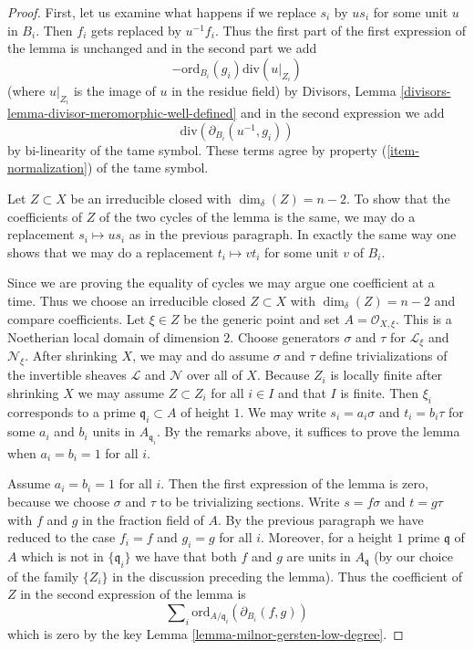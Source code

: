\begin{proof}
First, let us examine what happens if we replace $s_i$ by $us_i$
for some unit $u$ in $B_i$. Then $f_i$ gets replaced by $u^{-1} f_i$.
Thus the first part of the first expression of the lemma is unchanged
and in the second part we add
$$
-\text{ord}_{B_i}(g_i)\text{div}(u|_{Z_i})
$$
(where $u|_{Z_i}$ is the image of $u$ in the residue field) by
Divisors, Lemma \ref{divisors-lemma-divisor-meromorphic-well-defined}
and in the second expression we add
$$
\text{div}(\partial_{B_i}(u^{-1}, g_i))
$$
by bi-linearity of the tame symbol. These terms agree by property
(\ref{item-normalization}) of the tame symbol.

\medskip\noindent
Let $Z \subset X$ be an irreducible closed with $\dim_\delta(Z) = n - 2$.
To show that the coefficients of $Z$ of the two cycles of the lemma
is the same, we may do a replacement $s_i \mapsto us_i$ as in the previous
paragraph. In exactly the same way one shows that we may do a replacement
$t_i \mapsto vt_i$ for some unit $v$ of $B_i$.

\medskip\noindent
Since we are proving the equality of cycles we may argue one coefficient
at a time. Thus we choose an irreducible closed $Z \subset X$
with $\dim_\delta(Z) = n - 2$ and compare coefficients. Let $\xi \in Z$
be the generic point and set $A = \mathcal{O}_{X, \xi}$. This is a Noetherian
local domain of dimension $2$. Choose generators $\sigma$ and $\tau$
for $\mathcal{L}_\xi$ and $\mathcal{N}_\xi$. After shrinking $X$, we may
and do assume $\sigma$ and $\tau$ define trivializations
of the invertible sheaves $\mathcal{L}$ and $\mathcal{N}$ over all of $X$.
Because $Z_i$ is locally
finite after shrinking $X$ we may assume $Z \subset Z_i$ for all $i \in I$
and that $I$ is finite. Then $\xi_i$ corresponds to a prime
$\mathfrak q_i \subset A$ of height $1$.
We may write $s_i = a_i \sigma$ and $t_i = b_i \tau$
for some $a_i$ and $b_i$ units in $A_{\mathfrak q_i}$.
By the remarks above, it suffices to prove the lemma when
$a_i = b_i = 1$ for all $i$.

\medskip\noindent
Assume $a_i = b_i = 1$ for all $i$. Then the first expression of the
lemma is zero, because we choose $\sigma$ and $\tau$ to be trivializing
sections. Write $s = f\sigma$ and $t = g \tau$ with $f$ and $g$ in the
fraction field of $A$. By the previous paragraph we have reduced to the case
$f_i = f$ and $g_i = g$ for all $i$. Moreover, for a height $1$ prime
$\mathfrak q$ of $A$ which is not in $\{\mathfrak q_i\}$ we have
that both $f$ and $g$ are units in $A_\mathfrak q$ (by our choice of
the family $\{Z_i\}$ in the discussion preceding the lemma). Thus
the coefficient of $Z$ in the second expression of the lemma is
$$
\sum\nolimits_i \text{ord}_{A/\mathfrak q_i}(\partial_{B_i}(f, g))
$$
which is zero by the key Lemma \ref{lemma-milnor-gersten-low-degree}.
\end{proof}

